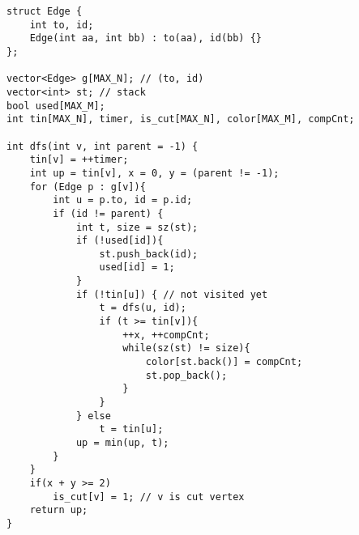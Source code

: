 \begin{verbatim}
struct Edge {
	int to, id;
	Edge(int aa, int bb) : to(aa), id(bb) {}
};

vector<Edge> g[MAX_N]; // (to, id)
vector<int> st; // stack
bool used[MAX_M];
int tin[MAX_N], timer, is_cut[MAX_N], color[MAX_M], compCnt;

int dfs(int v, int parent = -1) {
	tin[v] = ++timer;
	int up = tin[v], x = 0, y = (parent != -1);
	for (Edge p : g[v]){
		int u = p.to, id = p.id;
		if (id != parent) {
			int t, size = sz(st);
			if (!used[id]){
				st.push_back(id);
				used[id] = 1;
			}
			if (!tin[u]) { // not visited yet
				t = dfs(u, id);
				if (t >= tin[v]){
					++x, ++compCnt;
					while(sz(st) != size){
						color[st.back()] = compCnt;
						st.pop_back();
					}
				}
			} else
				t = tin[u];
			up = min(up, t);
		}
	}
	if(x + y >= 2)
		is_cut[v] = 1; // v is cut vertex
	return up;
}
\end{verbatim}
